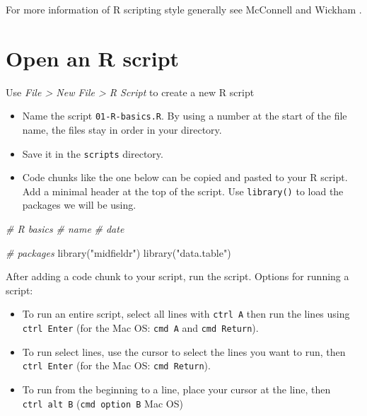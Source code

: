 \documentclass[
]{book}
\newenvironment{Shaded}{\begin{snugshade}}{\end{snugshade}}
\newcommand{\CommentTok}[1]{\textcolor[rgb]{0.56,0.35,0.01}{\textit{#1}}}
\newcommand{\FunctionTok}[1]{\textcolor[rgb]{0.00,0.00,0.00}{#1}}
\newcommand{\NormalTok}[1]{#1}
\newcommand{\StringTok}[1]{\textcolor[rgb]{0.31,0.60,0.02}{#1}}
\providecommand{\tightlist}{%
  \setlength{\itemsep}{0pt}\setlength{\parskip}{0pt}}
\begin{document}
For more information of R scripting style generally see McConnell \citeyearpar{McConnell:2004} and Wickham \citeyearpar{Wickham:2019:styleguide}.

\hypertarget{open-an-r-script}{%
\section{Open an R script}\label{open-an-r-script}}

Use \emph{File \textgreater{} New File \textgreater{} R Script} to create a new R script

\begin{itemize}
\tightlist
\item
  Name the script \texttt{01-R-basics.R}. By using a number at the start of the file name, the files stay in order in your directory.\\
\item
  Save it in the \texttt{scripts} directory.
\item
  Code chunks like the one below can be copied and pasted to your R script. Add a minimal header at the top of the script. Use \texttt{library()} to load the packages we will be using.
\end{itemize}

\begin{Shaded}
\begin{Highlighting}[]
\CommentTok{\# R basics }
\CommentTok{\# name }
\CommentTok{\# date }

\CommentTok{\# packages}
\FunctionTok{library}\NormalTok{(}\StringTok{"midfieldr"}\NormalTok{)}
\FunctionTok{library}\NormalTok{(}\StringTok{"data.table"}\NormalTok{)}
\end{Highlighting}
\end{Shaded}

After adding a code chunk to your script, run the script. Options for running a script:

\begin{itemize}
\tightlist
\item
  To run an entire script, select all lines with \texttt{ctrl\ A} then run the lines using \texttt{ctrl\ Enter} (for the Mac OS: \texttt{cmd\ A} and \texttt{cmd\ Return}).
\item
  To run select lines, use the cursor to select the lines you want to run, then \texttt{ctrl\ Enter} (for the Mac OS: \texttt{cmd\ Return}).
\item
  To run from the beginning to a line, place your cursor at the line, then \texttt{ctrl\ alt\ B} (\texttt{cmd\ option\ B} Mac OS)
\end{itemize}
\end{document}
